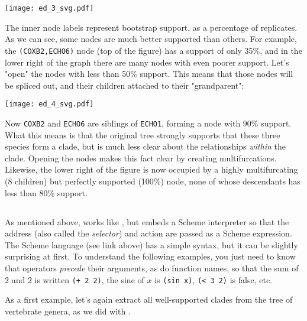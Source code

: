 \begin{center}
\texttt{[image: ed\_3\_svg.pdf]}
\end{center}

\noindent{}The inner node labels represent bootstrap support, as a percentage of
replicates. As we can see, some nodes are much better supported than others.
For example, the \texttt{(COXB2,ECHO6)} node (top of the figure) has a support
of only 35\%, and in the lower right of the graph there are many nodes with even
poorer support. Let's "open" the nodes with less than 50\% support. This means
that those nodes will be spliced out, and their children attached to their
"grandparent":


\begin{center}
\texttt{[image: ed\_4\_svg.pdf]}
\end{center}

\noindent{}Now \texttt{COXB2} and \texttt{ECHO6} are siblings of
\texttt{ECHO1}, forming a node with 90\% support. What this means is that the
original tree strongly supports that these three species form a clade, but is
much less clear about the relationships \emph{within} the clade. Opening the
nodes makes this fact clear by creating multifurcations. Likewise, the lower
right of the figure is now occupied by a highly multifurcating (8 children) but
perfectly supported (100\%) node, none of whose descendants has less than 80\%
support.

\subsection{\sched}

As mentioned above, \sched{} works like \ed{}, but embeds a Scheme interpreter
so that the address (also called the {\em selector}) and action are passed as a
Scheme expression. The Scheme language (see link above) has a simple syntax,
but it can be slightly surprising at first. To understand the following
examples, you just need to know that operators \emph{precede} their arguments,
as do function names, so that the sum of 2 and 2 is written \texttt{(+ 2 2)},
the sine of $x$ is \texttt{(sin x)}, \texttt{(< 3 2)} is false, etc.

\noindent{}As a first example, let's again extract all
well-supported clades from the tree of vertebrate genera, as we did with \ed.


\begin{samepage}

\end{samepage}

